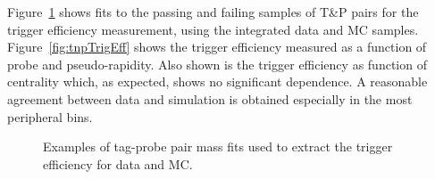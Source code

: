 Figure~\ref{fig:tnpTrigFit} shows fits to the passing and failing samples of T\&P pairs for the
trigger efficiency measurement, using the integrated data and MC samples. %
%
%
Figure~\ref{fig:tnpTrigEff} shows the trigger efficiency measured as a function of probe \pt and pseudo-rapidity.
Also shown is the trigger efficiency as function of centrality which, as expected, shows no significant dependence. 
A reasonable agreement between data and simulation is obtained especially in the most peripheral bins. 


\begin{figure}[hp]
  \begin{center}
    \hspace{1em}
    \caption{Examples of tag-probe pair mass fits used to extract the trigger efficiency for data and MC.}%
    \label{fig:tnpTrigFit}
  \end{center}
\end{figure}


